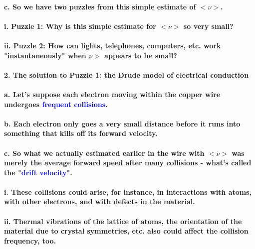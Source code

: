 \documentclass{article}
\begin{document}
\paragraph{\indent c. So we have two puzzles from this simple estimate of $<\nu>$.}
\paragraph{\indent\indent i. Puzzle 1: Why is this simple estimate for $<\nu>$ so very small?}
\paragraph{\indent\indent ii. Puzzle 2: How can lights, telephones, computers, etc. work "instantaneously" when $\nu>$ appears to be small?}
\paragraph{2. The solution to Puzzle 1: the Drude model of electrical conduction}
\paragraph{\indent a. Let's suppose each electron moving within the copper wire undergoes \textcolor{blue}{frequent collisions}.}
\paragraph{\indent b. Each electron only goes a very small distance before it runs into something that kills off its forward velocity.}
\paragraph{\indent c. So what we actually estimated earlier in the wire with $<\nu>$ was merely the average forward speed after many collisions - what's called the "\textcolor{blue}{drift velocity}".}
\paragraph{\indent\indent i. These collisions could arise, for instance, in interactions with atoms, with other electrons, and with defects in the material.}
\paragraph{\indent\indent ii. Thermal vibrations of the lattice of atoms, the orientation of the material due to crystal symmetries, etc. also could affect the collision frequency, too.}
\end{document}
